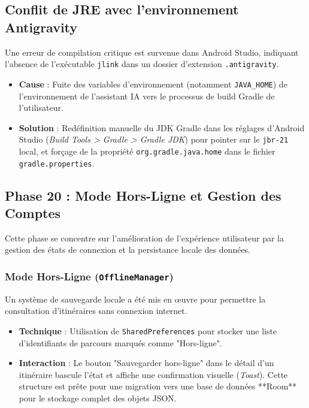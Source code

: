 \documentclass{article}
\begin{document}
\subsection{Conflit de JRE avec l'environnement Antigravity}
Une erreur de compilation critique est survenue dans Android Studio, indiquant l'absence de l'exécutable \texttt{jlink} dans un dossier d'extension \texttt{.antigravity}.
\begin{itemize}
    \item \textbf{Cause} : Fuite des variables d'environnement (notamment \texttt{JAVA\_HOME}) de l'environnement de l'assistant IA vers le processus de build Gradle de l'utilisateur.
    \item \textbf{Solution} : Redéfinition manuelle du JDK Gradle dans les réglages d'Android Studio (\textit{Build Tools > Gradle > Gradle JDK}) pour pointer sur le \texttt{jbr-21} local, et forçage de la propriété \texttt{org.gradle.java.home} dans le fichier \texttt{gradle.properties}.
\end{itemize}

\subsection{Phase 20 : Mode Hors-Ligne et Gestion des Comptes}
Cette phase se concentre sur l'amélioration de l'expérience utilisateur par la gestion des états de connexion et la persistance locale des données.

\subsubsection{Mode Hors-Ligne (\texttt{OfflineManager})}
Un système de sauvegarde locale a été mis en œuvre pour permettre la consultation d'itinéraires sans connexion internet.
\begin{itemize}
    \item \textbf{Technique} : Utilisation de \texttt{SharedPreferences} pour stocker une liste d'identifiants de parcours marqués comme "Hors-ligne".
    \item \textbf{Interaction} : Le bouton "Sauvegarder hors-ligne" dans le détail d'un itinéraire bascule l'état et affiche une confirmation visuelle (\textit{Toast}). Cette structure est prête pour une migration vers une base de données **Room** pour le stockage complet des objets JSON.
\end{itemize}
\end{document}
